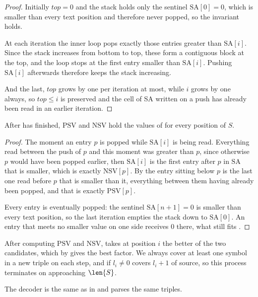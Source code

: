 \begin{proof}
    Initially \(\mathit{top} = 0\) and the stack holds only the sentinel \(\mathrm{SA}[0] = 0\), which is smaller than every text position and therefore never popped, so the invariant holds.

    At each iteration the inner loop pops exactly those entries greater than \(\mathrm{SA}[i]\). Since the stack increases from bottom to top, these form a contiguous block at the top, and the loop stops at the first entry smaller than \(\mathrm{SA}[i]\). Pushing \(\mathrm{SA}[i]\) afterwards therefore keeps the stack increasing.

    And the last, \(\mathit{top}\) grows by one per iteration at most, while \(i\) grows by one always, so \(\mathit{top} \leq i\) is preserved and the cell of SA written on a push has already been read in an earlier iteration.
\end{proof}


\begin{theorem}
\label{thm:kkp-scan}
    After  has finished, \(\mathrm{PSV}\) and \(\mathrm{NSV}\) hold the values of  for every position of \(S\).
\end{theorem}

\begin{proof}
    The moment an entry \(p\) is popped while \(\mathrm{SA}[i]\) is being read. Everything read between the push of \(p\) and this moment was greater than \(p\), since otherwise \(p\) would have been popped earlier, then \(\mathrm{SA}[i]\) is the first entry after \(p\) in \(\mathrm{SA}\) that is smaller, which is exactly \(\mathrm{NSV}[p]\). By  the entry sitting below \(p\) is the last one read before \(p\) that is smaller than it, everything between them having already been popped, and that is exactly \(\mathrm{PSV}[p]\).

    Every entry is eventually popped: the sentinel \(\mathrm{SA}[n+1] = 0\) is smaller than every text position, so the last iteration empties the stack down to \(\mathrm{SA}[0]\). An entry that meets no smaller value on one side receives \(0\) there, what still fits .
\end{proof}

After computing \(\mathrm{PSV}\) and \(\mathrm{NSV}\),  takes at position \(i\) the better of the two candidates, which by  gives the best factor. We always cover at least one symbol in a new triple on each step, and if \(l_i \neq 0\) covers \(l_i + 1\) of source, so this process terminates on approaching \(\len{S}\).

The decoder is the same as in  and parses the same triples.
